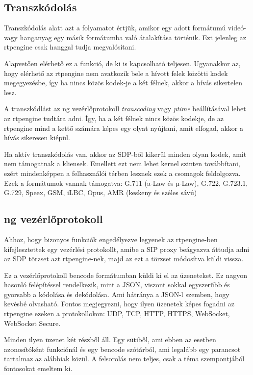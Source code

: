 \subsection{Transzkódolás}

Transzkódolás alatt azt a folyamatot értjük, amikor egy adott formátumú videó- vagy 
hanganyag egy másik formátumba való átalakítása történik. Ezt jelenleg az rtpengine 
csak hanggal tudja megvalósítani. 

Alapvetően elérhető ez a funkció, de ki is kapcsolható teljesen. Ugyanakkor az, hogy 
elérhető az rtpengine nem avatkozik bele a hívott felek közötti kodek megegyezésbe, 
így ha nincs közös kodek-je a két félnek, akkor a hívás sikertelen lesz.

A transzkódlást az ng vezérlőprotokoll \textit{transcoding} vagy \textit{ptime} beállításával
lehet az rtpengine tudtára adni. Így, ha a két félnek nincs közös kodekje, de az rtpengine
mind a kettő számára képes egy olyat nyújtani, amit elfogad, akkor a hívás sikeresen kiépül.

Ha aktív transzkódolás van, akkor az SDP-ből kikerül minden olyan kodek, amit nem támogatnak
a kliensek. Emellett ezt nem lehet kernel szinten továbbítani, ezért mindenképpen a 
felhasználói térben lesznek ezek a csomagok feldolgozva. \\

Ezek a formátumok vannak támogatva: G.711 (a-Law és µ-Law), G.722, G.723.1, G.729, Speex, 
GSM, iLBC, Opus, AMR (keskeny és széles sávú)

\subsection{ng vezérlőprotokoll}

Ahhoz, hogy bizonyos funkciók engedélyezve legyenek az rtpengine-ben kifejlesztettek 
egy vezérlési protokollt, amibe a SIP proxy beágyazva áttudja adni az SDP törzset 
azt rtpengine-nek, majd az ezt a törzset módosítva küldi vissza. 

Ez a vezérlőprotokoll bencode formátumban küldi ki el az üzeneteket. Ez nagyon hasonló
felépítéssel rendelkezik, mint a JSON, viszont sokkal egyszerűbb és gyorsabb a kódolása 
és dekódolása. Ami hátránya a JSON-l szemben, hogy kevésbé olvasható. Fontos 
megjegyezni, hogy ilyen üzenetek képes fogadni az rtpengine ezeken a protokollokon: 
UDP, TCP, HTTP, HTTPS, WebSocket, WebSocket Secure. 

Minden ilyen üzenet két részből áll. Egy sütiből, ami ebben az esetben azonosítóként
funkciónál és egy bencode szótárból, ami legalább egy parancsot tartalmaz az 
alábbiak közül. A felsorolás nem teljes, csak a téma szempontjából fontosokat 
emeltem ki.

